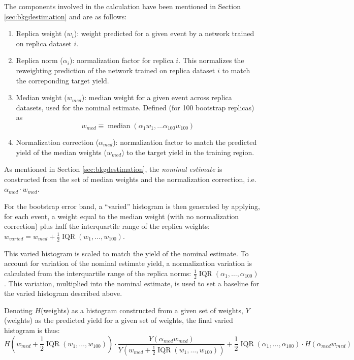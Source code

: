 The components involved in the calculation have been mentioned in Section \ref{sec:bkgdestimation} and 
are as follows:
\begin{enumerate}
\item Replica weight ($w_{i}$): weight predicted for a given event by a network trained on replica 
dataset $i$.
\item Replica norm ($\alpha_{i}$): normalization factor for replica $i$. This normalizes the reweighting 
prediction of the network trained on replica dataset $i$ to match the correponding target yield.
\item Median weight ($w_{med}$): median weight for a given event across replica datasets, used for the nominal estimate. Defined (for 100 bootstrap replicas) as
\begin{equation}
w_{med} \equiv \operatorname{median}(\alpha_{1}w_{1}, \ldots \alpha_{100}w_{100})
\end{equation}
\item Normalization correction ($\alpha_{med}$): normalization factor to match the predicted yield of the median weights
($w_{med}$) to the target yield in the training region.
\end{enumerate}

As mentioned in Section \ref{sec:bkgdestimation}, the \emph{nominal estimate} is constructed from the set of
median weights and the normalization correction, i.e. $\alpha_{med}\cdot w_{med}$.

For the bootstrap error band, a ``varied'' histogram is then generated by applying, for each event, a weight
equal to the median weight (with no normalization correction) plus half the interquartile range of 
the replica weights: $w_{varied} = w_{med} + \frac{1}{2}\operatorname{IQR}(w_{1},\ldots, w_{100})$.

This varied histogram is scaled to match the yield of the nominal estimate. To account for variation of the 
nominal estimate yield, a normalization variation is calculated from the interquartile range of the replica norms:
$\frac{1}{2}\operatorname{IQR}(\alpha_{1}, \ldots, \alpha_{100})$. This variation, multiplied into the nominal
estimate, is used to set a baseline for the varied histogram described above.

Denoting $H$(weights) as a histogram constructed from a given set of weights, $Y$(weights) as the predicted yield
for a given set of weights, the final varied histogram is thus:
\begin{equation}
H(w_{med} +\frac{1}{2}\operatorname{IQR}(w_{1},\ldots, w_{100}))\cdot \frac{Y(\alpha_{med}w_{med})}{Y(w_{med} +\frac{1}{2}\operatorname{IQR}(w_{1},\ldots, w_{100}))} + \frac{1}{2}\operatorname{IQR}(\alpha_{1}, \ldots, \alpha_{100})\cdot H(\alpha_{med}w_{med})
\end{equation}

